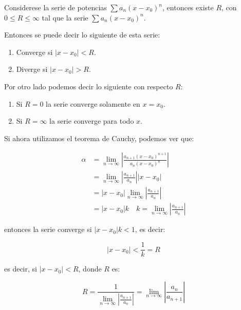 		\begin{teorema}
			Considerese la serie de potencias $\sum a_n(x - x_0)^n$, entonces existe $R$, con $0 \leq R \leq \infty$ tal que la serie $\sum a_n (x - x_0)^n$.

			Entonces se puede decir lo siguiente de esta serie:

			\begin{enumerate}
				\item Converge si $|x - x_0| < R$.
				\item Diverge si $|x - x_0| > R$.
			\end{enumerate}

			Por otro lado podemos decir lo siguiente con respecto $R$:

			\begin{enumerate}
				\item Si $R = 0$ la serie converge solamente en $x = x_0$.
				\item Si $R = \infty$ la serie converge para todo $x$.
			\end{enumerate}

			Si ahora utilizamos el teorema de Cauchy, podemos ver que:

			\begin{align*}
				\alpha &= \lim_{n \to \infty} \left| \frac{a_{n+1}(x - x_0)^{n+1}}{a_n (x - x_0)^n} \right| \\
				&= \lim_{n \to \infty} \left| \frac{a_{n+1}}{a_n} \right| |x - x_0| \\
				&= |x - x_0| \lim_{n \to \infty} \left| \frac{a_{n+1}}{a_n} \right| \\
				&= |x - x_0| k \quad k = \lim_{n \to \infty} \left| \frac{a_{n+1}}{a_n} \right|
			\end{align*}

			entonces la serie converge si $|x - x_0|k < 1$, es decir:

			\begin{equation*}
				|x - x_0| < \frac{1}{k} = R
			\end{equation*}

			es decir, si $|x - x_0| < R$, donde $R$ es:

			\begin{equation*}
				R = \frac{1}{\lim_{n \to \infty} \left| \frac{a_{n+1}}{a_n} \right|} = \lim_{n \to \infty} \left| \frac{a_{n}}{a_{n+1}} \right|
			\end{equation*}
		\end{teorema}

		\begin{ejemplo}
		\end{ejemplo}

